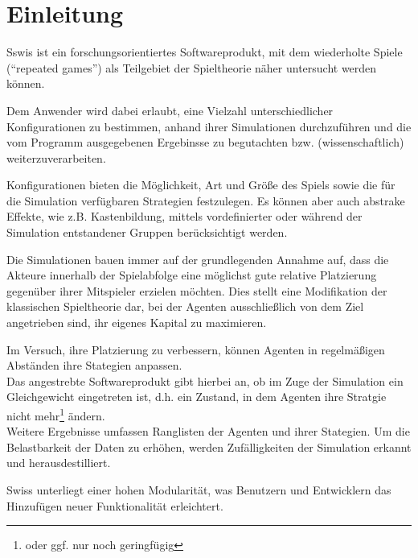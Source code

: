 \section{Einleitung}

Sswis ist ein forschungsorientiertes Softwareprodukt, mit dem wiederholte Spiele ("`repeated games"') als Teilgebiet der Spieltheorie näher untersucht werden können.

Dem Anwender wird dabei erlaubt, eine Vielzahl unterschiedlicher Konfigurationen zu bestimmen, anhand ihrer Simulationen durchzuführen und die vom Programm ausgegebenen Ergebinsse zu begutachten bzw. (wissenschaftlich) weiterzuverarbeiten.

Konfigurationen bieten die Möglichkeit, Art und Größe des Spiels sowie die für die Simulation verfügbaren Strategien festzulegen. Es können aber auch abstrake Effekte, wie z.B. Kastenbildung, mittels vordefinierter oder während der Simulation entstandener Gruppen berücksichtigt werden.

Die Simulationen bauen immer auf der grundlegenden Annahme auf, dass die Akteure innerhalb der Spielabfolge eine möglichst gute relative Platzierung gegenüber ihrer Mitspieler erzielen möchten.
Dies stellt eine Modifikation der klassischen Spieltheorie dar, bei der Agenten ausschließlich von dem Ziel angetrieben sind, ihr eigenes Kapital zu maximieren.

Im Versuch, ihre Platzierung zu verbessern, können Agenten in regelmäßigen Abständen ihre Stategien anpassen.\\
Das angestrebte Softwareprodukt gibt hierbei an, ob im Zuge der Simulation ein Gleichgewicht eingetreten ist, d.h. ein Zustand, in dem Agenten ihre Stratgie nicht mehr\footnote{oder ggf. nur noch geringfügig} ändern.\\
Weitere Ergebnisse umfassen Ranglisten der Agenten und ihrer Stategien.
Um die Belastbarkeit der Daten zu erhöhen, werden Zufälligkeiten der Simulation erkannt und herausdestilliert.

Swiss unterliegt einer hohen Modularität, was Benutzern und Entwicklern das Hinzufügen neuer Funktionalität erleichtert.